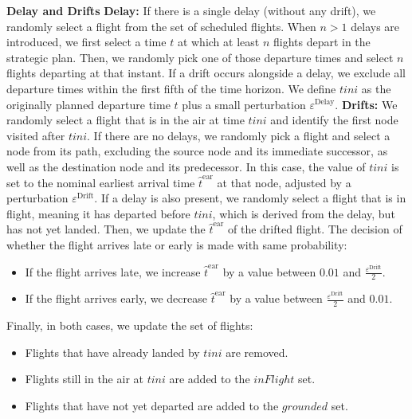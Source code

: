 \documentclass[../../thesis.tex]{subfiles}
\begin{document}
\textbf{Delay and Drifts}\newline\newline
\textbf{Delay:} If there is a single delay (without any drift), we randomly select a flight from the set of scheduled flights.  
When $n>1$ delays are introduced, we first select a time $t$ at which at least $n$ flights depart in the strategic plan. Then, we randomly pick one of those departure times and select $n$ flights departing at that instant.  
If a drift occurs alongside a delay, we exclude all departure times within the first fifth of the time horizon.  
We define $tini$ as the originally planned departure time $t$ plus a small perturbation $\varepsilon^\text{Delay}$.  
\newline\newline
\textbf{Drifts:} We randomly select a flight that is in the air at time $tini$ and identify the first node visited after $tini$.  
If there are no delays, we randomly pick a flight and select a node from its path, excluding the source node and its immediate successor, as well as the destination node and its predecessor.  
In this case, the value of $tini$ is set to the nominal earliest arrival time $\hat{t}^\text{ear}$ at that node, adjusted by a perturbation $\varepsilon^\text{Drift}$.  
If a delay is also present, we randomly select a flight that is in flight, meaning it has departed before $tini$, which is derived from the delay, but has not yet landed.   
Then, we update the $\hat{t}^\text{ear}$ of the drifted flight. The decision of whether the flight arrives late or early is made with same probability:  
\begin{itemize}
    \item If the flight arrives late, we increase $\hat{t}^\text{ear}$ by a value between $0.01$ and $\frac{\varepsilon^\text{Drift}}{2}$.
    \item If the flight arrives early, we decrease $\hat{t}^\text{ear}$ by a value between $\frac{\varepsilon^\text{Drift}}{2}$ and $0.01$.
\end{itemize}

Finally, in both cases, we update the set of flights:  
\begin{itemize}
    \item Flights that have already landed by $tini$ are removed.
    \item Flights still in the air at $tini$ are added to the $inFlight$ set.
    \item Flights that have not yet departed are added to the $grounded$ set.
\end{itemize}
    
\end{document}
